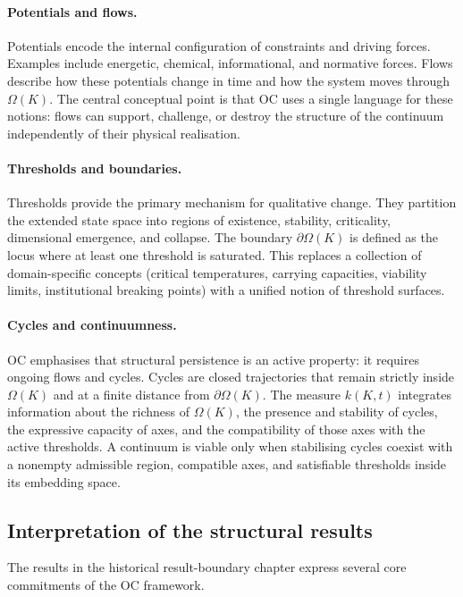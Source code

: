 \paragraph{Potentials and flows.}
Potentials encode the internal configuration of constraints and driving
forces. Examples include energetic, chemical, informational, and normative
forces.
Flows describe how these potentials change in time and how the system moves through \(\Omega(K)\).
The central conceptual point is that OC uses a single language for these notions:
flows can support, challenge, or destroy the structure of the continuum independently of their physical realisation.

\paragraph{Thresholds and boundaries.}
Thresholds provide the primary mechanism for qualitative change.
They partition the extended state space into regions of existence, stability, criticality, dimensional emergence, and collapse.
The boundary \(\partial\Omega(K)\) is defined as the locus where at least one threshold is saturated.
This replaces a collection of domain-specific concepts (critical temperatures, carrying capacities, viability limits, institutional breaking points) with a unified notion of threshold surfaces.

\paragraph{Cycles and continuumness.}
OC emphasises that structural persistence is an active property: it requires ongoing flows and cycles.
Cycles are closed trajectories that remain strictly inside \(\Omega(K)\) and at a finite distance from \(\partial\Omega(K)\).
The measure \(k(K,t)\) integrates information about the richness of \(\Omega(K)\), the presence and stability of cycles, the expressive capacity of axes, and the compatibility of those axes with the active thresholds.
A continuum is viable only when stabilising cycles coexist with a nonempty
admissible region, compatible axes, and satisfiable thresholds inside its
embedding space.

\subsection{Interpretation of the structural results}

The results in the historical result-boundary chapter express several core commitments of the OC framework.

